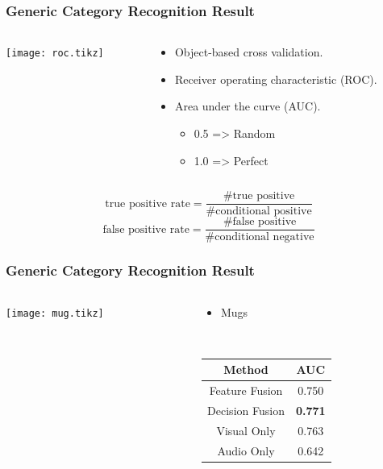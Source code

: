 \documentclass[t]{beamer}
\begin{document}
\begin{frame}
  \frametitle{Generic Category Recognition Result}

  \begin{columns}
    \begin{column}{.5\linewidth}
      \centering
      \scriptsize
      \texttt{[image: roc.tikz]}
    \end{column}
    \begin{column}{.5\linewidth}
      \begin{itemize}
        \item Object-based cross validation.
        \item Receiver operating characteristic (ROC).
        \item Area under the curve (AUC).
          \begin{itemize}
            \item 0.5 => Random
            \item 1.0 => Perfect 
          \end{itemize}
      \end{itemize}
    \end{column}
  \end{columns}
  {\scriptsize
    \[ \text{true positive rate} =  \frac{\text{\# true positive}}{\text{\# conditional positive}} \]
    \[ \text{false positive rate} =  \frac{\text{\# false positive}}{\text{\# conditional negative}} \]
  }
\end{frame}
\fi

\begin{frame}
  \frametitle{Generic Category Recognition Result}

  \begin{columns}
    \begin{column}{.6\linewidth}
      \centering
      \footnotesize
      \texttt{[image: mug.tikz]}
    \end{column}

    \begin{column}{.4\linewidth}
      \vspace{-1.4\linewidth}
      \begin{itemize}
        \item Mugs
      \end{itemize}
      ~

      \begin{tabular}[h]{c|c}
        \hline
        Method & AUC \\ \hline \hline
        Feature Fusion & 0.750 \\ \hline
        Decision Fusion  & \textbf{0.771} \\ \hline
        Visual Only & 0.763 \\ \hline
        Audio Only & 0.642 \\ \hline
      \end{tabular}
    \end{column}
  \end{columns}
\end{frame}
\end{document}
